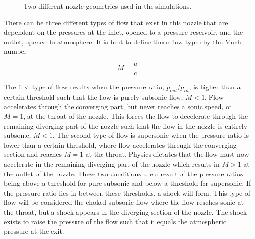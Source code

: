 \documentclass{article}%
\numberwithin{equation}{section}
\begin{document}
\begin{figure}[h!]
\centering
{}
\vfill
{}
\caption{Two different nozzle geometries used in the simulations. \label{nozzgeo}}
\end{figure}

There can be three different types of flow that exist in this nozzle that are dependent on the pressures at the inlet, opened to a pressure reservoir, and the outlet, opened to atmosphere. It is best to define these flow types by the Mach number

\begin{equation}
M = \frac{u}{c}
\end{equation} 

The first type of flow results when the pressure ratio, $p_{out} / p_{in}$, is higher than a certain threshold such that the flow is purely subsonic flow, $M < 1$. Flow accelerates through the converging part, but never reaches a sonic speed, or $M = 1$, at the throat of the nozzle. This forces the flow to decelerate through the remaining diverging part of the nozzle such that the flow in the nozzle is entirely subsonic, $M < 1$. The second type of flow is supersonic when the pressure ratio is lower than a certain threshold, where flow accelerates through the converging section and reaches $M = 1$ at the throat. Physics dictates that the flow must now accelerate in the remaining diverging part of the nozzle which results in $M > 1$ at the outlet of the nozzle. These two conditions are a result of the pressure ratios being above a threshold for pure subsonic and below a threshold for supersonic. If the pressure ratio lies in between these thresholds, a shock will form. This type of flow will be considered the choked subsonic flow where the flow reaches sonic at the throat, but a shock appears in the diverging section of the nozzle. The shock exists to raise the pressure of the flow such that it equals the atmospheric pressure at the exit.
\end{document}
